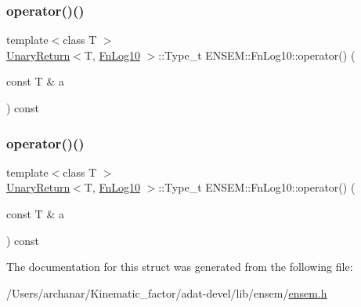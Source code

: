 \mbox{\label{structENSEM_1_1FnLog10_a391be0578edd7ffb0348e9dd601e8323}} 
\subsubsection{\texorpdfstring{operator()()}{operator()()}\hspace{0.1cm}{\footnotesize\ttfamily [2/3]}}
{\footnotesize\ttfamily template$<$class T $>$ \\
\mbox{\hyperlink{structENSEM_1_1UnaryReturn}{Unary\+Return}}$<$T, \mbox{\hyperlink{structENSEM_1_1FnLog10}{Fn\+Log10}} $>$\+::Type\+\_\+t E\+N\+S\+E\+M\+::\+Fn\+Log10\+::operator() (\begin{DoxyParamCaption}\item[{const T \&}]{a }\end{DoxyParamCaption}) const\hspace{0.3cm}{\ttfamily [inline]}}

\mbox{\label{structENSEM_1_1FnLog10_a391be0578edd7ffb0348e9dd601e8323}} 
\subsubsection{\texorpdfstring{operator()()}{operator()()}\hspace{0.1cm}{\footnotesize\ttfamily [3/3]}}
{\footnotesize\ttfamily template$<$class T $>$ \\
\mbox{\hyperlink{structENSEM_1_1UnaryReturn}{Unary\+Return}}$<$T, \mbox{\hyperlink{structENSEM_1_1FnLog10}{Fn\+Log10}} $>$\+::Type\+\_\+t E\+N\+S\+E\+M\+::\+Fn\+Log10\+::operator() (\begin{DoxyParamCaption}\item[{const T \&}]{a }\end{DoxyParamCaption}) const\hspace{0.3cm}{\ttfamily [inline]}}



The documentation for this struct was generated from the following file\+:\begin{DoxyCompactItemize}
\item 
/\+Users/archanar/\+Kinematic\+\_\+factor/adat-\/devel/lib/ensem/\mbox{\hyperlink{adat-devel_2lib_2ensem_2ensem_8h}{ensem.\+h}}\end{DoxyCompactItemize}
